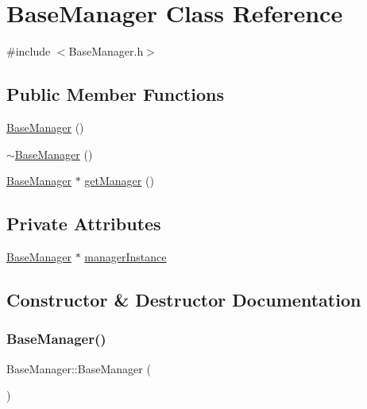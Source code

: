 \hypertarget{class_base_manager}{}\section{Base\+Manager Class Reference}
\label{class_base_manager}


{\ttfamily \#include $<$Base\+Manager.\+h$>$}

\subsection*{Public Member Functions}
\begin{DoxyCompactItemize}
\item 
\hyperlink{class_base_manager_a663ef30d41792bdecf2598a6285cfddd}{Base\+Manager} ()
\item 
\hyperlink{class_base_manager_af512e2d3b2a7727a2766a6c95a6b90a3}{$\sim$\+Base\+Manager} ()
\item 
\hyperlink{class_base_manager}{Base\+Manager} $\ast$ \hyperlink{class_base_manager_af85c9b7676acfa30dd14e5f7a878c3fa}{get\+Manager} ()
\end{DoxyCompactItemize}
\subsection*{Private Attributes}
\begin{DoxyCompactItemize}
\item 
\hyperlink{class_base_manager}{Base\+Manager} $\ast$ \hyperlink{class_base_manager_ae53c7fd979ff30128ef75bafe87a2ee8}{manager\+Instance}
\end{DoxyCompactItemize}


\subsection{Constructor \& Destructor Documentation}
\hypertarget{class_base_manager_a663ef30d41792bdecf2598a6285cfddd}{}\label{class_base_manager_a663ef30d41792bdecf2598a6285cfddd} 
\subsubsection{\texorpdfstring{Base\+Manager()}{BaseManager()}}
{\footnotesize\ttfamily Base\+Manager\+::\+Base\+Manager (\begin{DoxyParamCaption}{ }\end{DoxyParamCaption})}

